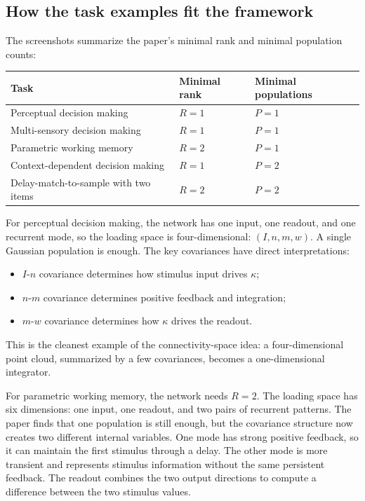 \documentclass[11pt]{article}
\begin{document}
\subsection{How the task examples fit the framework}

The screenshots summarize the paper's minimal rank and minimal population
counts:
\begin{center}
\begin{tabular}{@{}lll@{}}
\toprule
Task & Minimal rank & Minimal populations \\
\midrule
Perceptual decision making & $R=1$ & $P=1$ \\
Multi-sensory decision making & $R=1$ & $P=1$ \\
Parametric working memory & $R=2$ & $P=1$ \\
Context-dependent decision making & $R=1$ & $P=2$ \\
Delay-match-to-sample with two items & $R=2$ & $P=2$ \\
\bottomrule
\end{tabular}
\end{center}

For perceptual decision making, the network has one input, one readout, and one
recurrent mode, so the loading space is four-dimensional: $(I,n,m,w)$. A single
Gaussian population is enough. The key covariances have direct interpretations:
\begin{itemize}
  \item $I$-$n$ covariance determines how stimulus input drives $\kappa$;
  \item $n$-$m$ covariance determines positive feedback and integration;
  \item $m$-$w$ covariance determines how $\kappa$ drives the readout.
\end{itemize}
This is the cleanest example of the connectivity-space idea: a four-dimensional
point cloud, summarized by a few covariances, becomes a one-dimensional
integrator.

For parametric working memory, the network needs $R=2$. The loading space has
six dimensions: one input, one readout, and two pairs of recurrent patterns. The
paper finds that one population is still enough, but the covariance structure now
creates two different internal variables. One mode has strong positive feedback,
so it can maintain the first stimulus through a delay. The other mode is more
transient and represents stimulus information without the same persistent
feedback. The readout combines the two output directions to compute a difference
between the two stimulus values.
\end{document}
